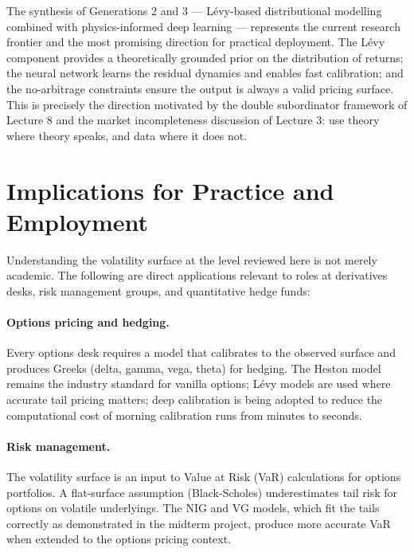 \documentclass[12pt, a4paper]{article}
\begin{document}
The synthesis of Generations 2 and 3 --- L\'{e}vy-based distributional
modelling combined with physics-informed deep learning --- represents
the current research frontier and the most promising direction for
practical deployment. The L\'{e}vy component provides a
theoretically grounded prior on the distribution of returns; the
neural network learns the residual dynamics and enables fast
calibration; and the no-arbitrage constraints ensure the output is
always a valid pricing surface. This is precisely the direction
motivated by the double subordinator framework of Lecture 8 and the
market incompleteness discussion of Lecture 3: use theory where theory
speaks, and data where it does not.

\section{Implications for Practice and Employment}

Understanding the volatility surface at the level reviewed here is not
merely academic. The following are direct applications relevant to roles
at derivatives desks, risk management groups, and quantitative hedge
funds:

\paragraph{Options pricing and hedging.}
Every options desk requires a model that calibrates to the observed
surface and produces Greeks (delta, gamma, vega, theta) for hedging.
The Heston model remains the industry standard for vanilla options;
L\'{e}vy models are used where accurate tail pricing matters;
deep calibration is being adopted to reduce the computational cost of
morning calibration runs from minutes to seconds.

\paragraph{Risk management.}
The volatility surface is an input to Value at Risk (VaR) calculations
for options portfolios. A flat-surface assumption (Black-Scholes)
underestimates tail risk for options on volatile underlyings. The NIG
and VG models, which fit the tails correctly as demonstrated in the
midterm project, produce more accurate VaR when extended to the
options pricing context.
\end{document}
